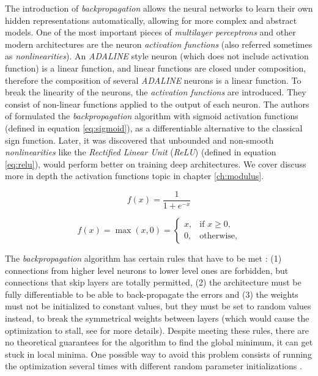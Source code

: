 The introduction of \textit{backpropagation} allows the neural networks to learn their own hidden representations automatically, allowing for more complex and abstract models. One of the most important pieces of \textit{multilayer perceptrons} and other modern architectures are the neuron \textit{activation functions} (also referred sometimes as \textit{nonlinearities}). An \textit{ADALINE} style neuron (which does not include activation function) is a linear function, and linear functions are closed under composition, therefore the composition of several \textit{ADALINE} neurons is a linear function. To break the linearity of the neurons, the \textit{activation functions} are introduced. They consist of non-linear functions applied to the output of each neuron. The authors of \autocite{hinton1986} formulated the \textit{backpropagation} algorithm with sigmoid activation functions (defined in equation \ref{eq:sigmoid}), as a differentiable alternative to the classical sign function. Later, it was discovered that unbounded and non-smooth \textit{nonlinearities} like the \textit{Rectified Linear Unit} (\textit{ReLU}) \autocite{nair2010} (defined in equation \ref{eq:relu}), would perform better on training deep architectures. We cover discuss more in depth the activation functions topic in chapter \ref{ch:modulus}.


\begin{equation}
\label{eq:sigmoid}
f(x) = \frac{1}{1+e^{-x}}
\end{equation}

\begin{equation}
\label{eq:relu}
f(x) = \max(x, 0) =
\begin{cases}
x,          & \text{if } x \geq 0 ,\\
0,         & \text{otherwise},
\end{cases}
\end{equation}

The \textit{backpropagation} algorithm has certain rules that have to be met \autocite{hinton1986}: (1) connections from higher level neurons to lower level ones are forbidden, but connections that skip layers are totally permitted, (2) the architecture must be fully differentiable to be able to back-propagate the errors and (3) the weights must not be initialized to constant values, but they must be set to random values instead, to break the symmetrical weights between layers (which would cause the optimization to stall, see \autocite{hinton1986} for more details). Despite meeting these rules, there are no theoretical guarantees for the algorithm to find the global minimum, it can get stuck in local minima. One possible way to avoid this problem consists of running the optimization several times with different random parameter initializations \autocite{haykin1998}.

